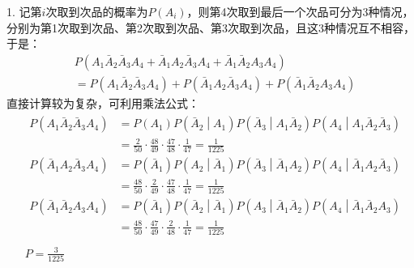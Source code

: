 1. 记第$i$次取到次品的概率为$P\left( A_i \right) $，则第4次取到最后一个次品可分为3种情况，分别为第1次取到次品、第2次取到次品、第3次取到次品，且这3种情况互不相容，于是：
\begin{align*}
&P\left( A_1\bar{A}_2\bar{A}_3A_4+\bar{A}_1A_2\bar{A}_3A_4+\bar{A}_1\bar{A}_2A_3A_4 \right) \\
&=P\left( A_1\bar{A}_2\bar{A}_3A_4 \right) +P\left( \bar{A}_1A_2\bar{A}_3A_4 \right) +P\left( \bar{A}_1\bar{A}_2A_3A_4 \right)
\end{align*}
直接计算较为复杂，可利用乘法公式：
\begin{align*}
&\begin{aligned}
	P\left( A_1\bar{A}_2\bar{A}_3A_4 \right) &=P\left( A_1 \right) P\left( \bar{A}_2 \middle| A_1 \right) P\left( \bar{A}_3 \middle| A_1\bar{A}_2 \right) P\left( A_4 \middle| A_1\bar{A}_2\bar{A}_3 \right)\\
	&=\frac{2}{50}\cdot \frac{48}{49}\cdot \frac{47}{48}\cdot \frac{1}{47}=\frac{1}{1225}\\
	P\left( \bar{A}_1A_2\bar{A}_3A_4 \right) &=P\left( \bar{A}_1 \right) P\left( A_2 \middle| \bar{A}_1 \right) P\left( \bar{A}_3 \middle| \bar{A}_1A_2 \right) P\left( A_4 \middle| \bar{A}_1A_2\bar{A}_3 \right)\\
	&=\frac{48}{50}\cdot \frac{2}{49}\cdot \frac{47}{48}\cdot \frac{1}{47}=\frac{1}{1225}\\
	P\left( \bar{A}_1\bar{A}_2A_3A_4 \right) &=P\left( \bar{A}_1 \right) P\left( \bar{A}_2 \middle| \bar{A}_1 \right) P\left( A_3 \middle| \bar{A}_1\bar{A}_2 \right) P\left( A_4 \middle| \bar{A}_1\bar{A}_2A_3 \right)\\
	&=\frac{48}{50}\cdot \frac{47}{49}\cdot \frac{2}{48}\cdot \frac{1}{47}=\frac{1}{1225}\\
\end{aligned} \\
&P=\frac{3}{1225}
\end{align*}

